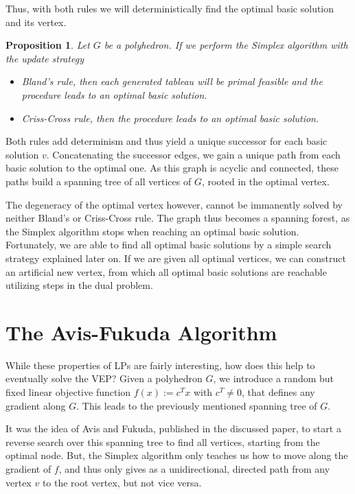 \documentclass[a4paper, 11pt]{article}
\newtheorem{proposition}{Proposition}
\begin{document}
Thus, with both rules we will deterministically find the optimal basic solution and its vertex. 

\begin{proposition}
	\label{PropoBland}
	Let $G$ be a polyhedron. If we perform the Simplex algorithm with the update strategy
	\begin{itemize}
		\item Bland's rule, then each generated tableau will be primal feasible and the procedure leads to an optimal basic solution.
		\item Criss-Cross rule, then the procedure leads to an optimal basic solution.
	\end{itemize}
\end{proposition}

Both rules add determinism and thus yield a unique successor for each basic solution $v$. Concatenating the successor edges, we gain a unique path from each basic solution to the optimal one. As this graph is acyclic and connected, these paths build a spanning tree of all vertices of $G$, rooted in the optimal vertex. \medskip

The degeneracy of the optimal vertex however, cannot be immanently solved by neither Bland's or Criss-Cross rule. The graph thus becomes a spanning forest, as the Simplex algorithm stops when reaching an optimal basic solution. Fortunately, we are able to find all optimal basic solutions by a simple search strategy explained later on. If we are given all optimal vertices, we can construct an artificial new vertex, from which all optimal basic solutions are reachable utilizing steps in the dual problem.

\section{The Avis-Fukuda Algorithm}

While these properties of LPs are fairly interesting, how does this help to eventually solve the VEP? Given a polyhedron $G$,  we introduce a random but fixed linear objective function $f(x):=c^Tx$ with $c^T\neq 0$, that defines any gradient along $G$. This leads to the previously mentioned spanning tree of $G$. \medskip

It was the idea of Avis and Fukuda, published in the discussed paper, to start a reverse search over this spanning tree to find all vertices, starting from the optimal node. But, the Simplex algorithm only teaches us how to move along the gradient of $f$, and thus only gives as a unidirectional, directed path from any vertex $v$ to the root vertex, but not vice versa. \medskip
\end{document}
